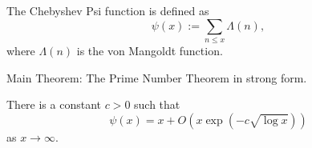
\begin{definition}\label{ChebyshevPsi}\leanok
The Chebyshev Psi function is defined as
$$
\psi(x) := \sum_{n \le x} \Lambda(n),
$$
where $\Lambda(n)$ is the von Mangoldt function.
\end{definition}



Main Theorem: The Prime Number Theorem in strong form.
\begin{theorem}[PrimeNumberTheorem]\label{StrongPNT}
There is a constant $c > 0$ such that
$$
\psi(x) = x + O(x \exp(-c \sqrt{\log x}))
$$
as $x\to \infty$.
\end{theorem}


